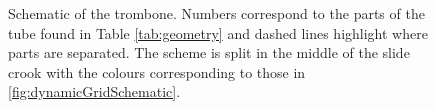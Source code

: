 \begin{figure}[ht]
\begin{tikzpicture}[scale = 8]
    
    \end{tikzpicture}
    \caption{Schematic of the trombone. Numbers correspond to the parts of the tube found in Table \ref{tab:geometry} and dashed lines highlight where parts are separated. The scheme is split in the middle of the slide crook with the colours corresponding to those in \ref{fig:dynamicGridSchematic}.}
    \label{fig:tromboneSchematic}
\end{figure}